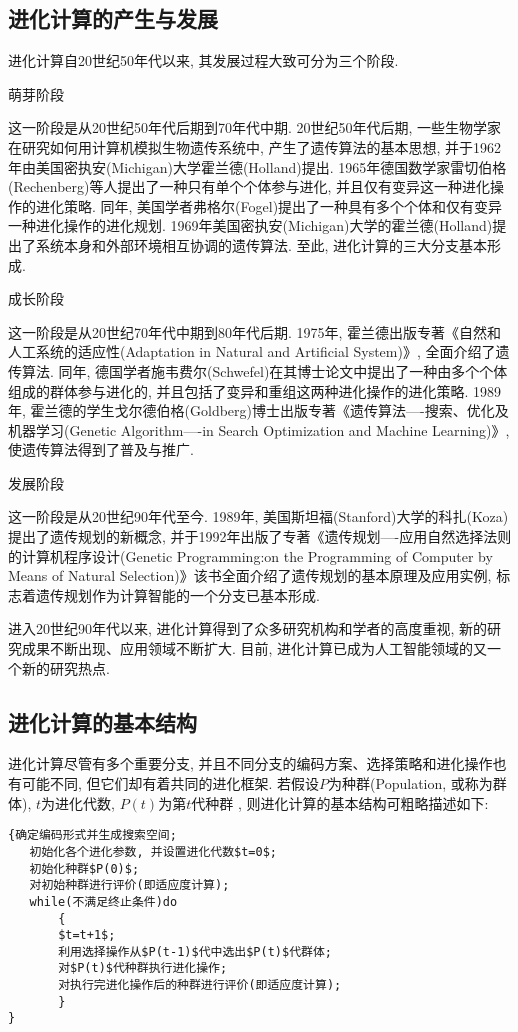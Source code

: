 \subsection{进化计算的产生与发展}
 进化计算自20世纪50年代以来, 其发展过程大致可分为三个阶段.

       萌芽阶段

     这一阶段是从20世纪50年代后期到70年代中期. 20世纪50年代后期, 一些生物学家在研究如何用计算机模拟生物遗传系统中, 产生了遗传算法的基本思想, 并于1962年由美国密执安(Michigan)大学霍兰德(Holland)提出. 1965年德国数学家雷切伯格(Rechenberg)等人提出了一种只有单个个体参与进化, 并且仅有变异这一种进化操作的进化策略. 同年, 美国学者弗格尔(Fogel)提出了一种具有多个个体和仅有变异一种进化操作的进化规划. 1969年美国密执安(Michigan)大学的霍兰德(Holland)提出了系统本身和外部环境相互协调的遗传算法. 至此, 进化计算的三大分支基本形成.

      成长阶段

     这一阶段是从20世纪70年代中期到80年代后期. 1975年, 霍兰德出版专著《自然和人工系统的适应性(Adaptation in Natural and Artificial System)》, 全面介绍了遗传算法. 同年, 德国学者施韦费尔(Schwefel)在其博士论文中提出了一种由多个个体组成的群体参与进化的, 并且包括了变异和重组这两种进化操作的进化策略. 1989年, 霍兰德的学生戈尔德伯格(Goldberg)博士出版专著《遗传算法----搜索、优化及机器学习(Genetic Algorithm----in Search Optimization and Machine Learning)》, 使遗传算法得到了普及与推广.

     发展阶段

     这一阶段是从20世纪90年代至今. 1989年, 美国斯坦福(Stanford)大学的科扎(Koza)提出了遗传规划的新概念, 并于1992年出版了专著《遗传规划----应用自然选择法则的计算机程序设计(Genetic Programming:on the Programming of Computer by Means of Natural Selection)》该书全面介绍了遗传规划的基本原理及应用实例, 标志着遗传规划作为计算智能的一个分支已基本形成.

    进入20世纪90年代以来, 进化计算得到了众多研究机构和学者的高度重视, 新的研究成果不断出现、应用领域不断扩大. 目前, 进化计算已成为人工智能领域的又一个新的研究热点.

\subsection{进化计算的基本结构}
进化计算尽管有多个重要分支, 并且不同分支的编码方案、选择策略和进化操作也有可能不同, 但它们却有着共同的进化框架. 若假设$P$为种群(Population, 或称为群体), $t$为进化代数,  $P(t)$为第$t$代种群 , 则进化计算的基本结构可粗略描述如下:
\begin{Verbatim}
{确定编码形式并生成搜索空间;
   初始化各个进化参数, 并设置进化代数$t=0$;
   初始化种群$P(0)$;
   对初始种群进行评价(即适应度计算);
   while(不满足终止条件)do
       {
       $t=t+1$;
       利用选择操作从$P(t-1)$代中选出$P(t)$代群体;
       对$P(t)$代种群执行进化操作;
       对执行完进化操作后的种群进行评价(即适应度计算);
       }
}
\end{Verbatim}

